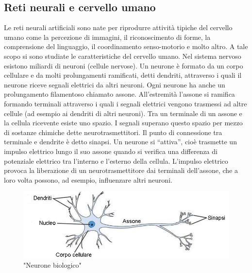 \documentclass[a4paper,11pt]{article}
\begin{document}
    \subsection {Reti neurali e cervello umano}
    Le reti neurali artificiali sono nate per riprodurre attività tipiche del
    cervello umano come la percezione di immagini, il riconoscimento di
    forme, la comprensione del linguaggio, il coordinamento senso-motorio e molto altro.
    A tale scopo si sono studiate le caratteristiche del cervello umano. 
    Nel sistema nervoso esistono miliardi di neuroni (cellule nervose). Un
    neurone è formato da un corpo cellulare e da molti prolungamenti
    ramificati, detti dendriti, attraverso i quali il neurone riceve segnali
    elettrici da altri neuroni. Ogni neurone ha anche un prolungamento
    filamentoso chiamato assone. All’estremità l’assone si ramifica formando terminali
    attraverso i quali i segnali elettrici vengono trasmessi ad altre cellule (ad
    esempio ai dendriti di altri neuroni). Tra un terminale di un assone e la
    cellula ricevente esiste uno spazio. I segnali superano questo spazio per
    mezzo di sostanze chimiche dette neurotrasmettitori. Il punto di
    connessione tra terminale e dendrite è detto sinapsi. 
    Un neurone si “attiva”, cioè trasmette un impulso elettrico lungo il suo
    assone quando si verifica una differenza di potenziale elettrico tra l’interno
    e l’esterno della cellula. L’impulso elettrico provoca la liberazione di un
    neurotrasmettitore dai terminali dell’assone, che a loro volta possono, ad
    esempio, influenzare altri neuroni. 
        
    \begin{figure}[h]
        \centering
        \includegraphics[scale=0.7]{cervello.jpg}
        \caption{"Neurone biologico"}
    \end{figure}
\end{document}

